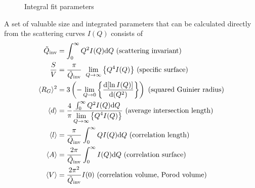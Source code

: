 \begin{figure}[htb]
\centering
\caption{Integral fit parameters}
\label{fig:QTintegralparameter}
\end{figure}

A set of valuable size and integrated parameters that can be
calculated directly from the scattering curves $I(Q)$
\cite{Damaschun1969,Sjoberg1974,Damaschun1971,Walter1985,Moller1995,book:Guinier:Fournet}
consists of
\begin{subequations}
\begin{align}
\tilde{Q}_\text{inv} &= \int_0^\infty Q^2I(Q) \mathrm{d}Q \mbox{ (scattering invariant)} \\
\frac{S}{V} &= \frac{\pi}{\tilde{Q}_\text{inv}} \;\; {\DS\lim_{Q \to \infty}\left\{Q^4I(Q)\right\}} \mbox{ (specific surface)} \\
\langle R_G \rangle^2 &= 3\left(-\DS\lim_{Q \to 0}\left\{\frac{\mathrm{d}[\ln I(Q)]}{\mathrm{d}(Q^2)}\right\}\right) \mbox{ (squared Guinier radius)} \\
\langle d \rangle &= \frac{4}{\pi}\frac{\int_0^\infty Q^2I(Q) \mathrm{d}Q}{\DS\lim_{Q \to \infty}\left\{Q^4I(Q)\right\}} \mbox{ (average intersection length)} \\
\langle l \rangle &= \frac{\pi}{\tilde{Q}_\text{inv}} \int_0^\infty QI(Q) \mathrm{d}Q \mbox{ (correlation length)} \\
\langle A \rangle &= \frac{2\pi}{\tilde{Q}_\text{inv}}\int_0^\infty I(Q) \mathrm{d}Q \mbox{ (correlation surface)} \\
\langle V \rangle &= \frac{2\pi^2}{\tilde{Q}_\text{inv}} I(0) \mbox{ (correlation volume, Porod volume)}
\end{align}
\end{subequations}


